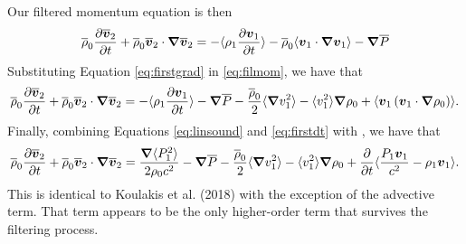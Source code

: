 Our filtered momentum equation is then
\begin{equation}
\label{eq:filmom}
\overline{\rho}_0\frac{\partial\overline{\boldsymbol{v}}_2}{\partial t} +\overline{\rho}_0\overline{\boldsymbol{v}}_2\cdot\boldsymbol{\nabla}\overline{\boldsymbol{v}}_2 = - \langle\rho_1\frac{\partial\boldsymbol{v}_1}{\partial t}\rangle 
                             -\overline{\rho}_0\langle\boldsymbol{v}_1\cdot\boldsymbol{\nabla}\boldsymbol{v}_1 \rangle
                             -\boldsymbol{\nabla}\overline{P}
\end{equation}
Substituting Equation \ref{eq:firstgrad} in \ref{eq:filmom}, we have that
\begin{equation}
\label{eq:filtwo}
\overline{\rho}_0\frac{\partial\overline{\boldsymbol{v}}_2}{\partial t} +\overline{\rho}_0\overline{\boldsymbol{v}}_2\cdot\boldsymbol{\nabla}\overline{\boldsymbol{v}}_2 = 
                             - \langle\rho_1\frac{\partial\boldsymbol{v}_1}{\partial t}\rangle 
                             -\boldsymbol{\nabla}\overline{P}
 -\frac{\overline{\rho}_0}{2}\langle\boldsymbol{\nabla} v_1^2\rangle -\langle v_1^2\rangle\boldsymbol{\nabla}\rho_0 
 +\langle\boldsymbol{v}_1\left(\boldsymbol{v}_1\cdot\boldsymbol{\nabla}\rho_0\right)\rangle .
\end{equation}
Finally, combining Equations \ref{eq:linsound} and \ref{eq:firstdt} with \label{eq:filtwo}, we have that
\begin{equation}
\label{eq:filthree}
\overline{\rho}_0\frac{\partial\overline{\boldsymbol{v}}_2}{\partial t} +\overline{\rho}_0\overline{\boldsymbol{v}}_2\cdot\boldsymbol{\nabla}\overline{\boldsymbol{v}}_2 = 
                             \frac{\boldsymbol{\nabla}\langle P_1^2 \rangle}{2\rho_0 c^2}
                             -\boldsymbol{\nabla}\overline{P}
 -\frac{\overline{\rho}_0}{2}\langle\boldsymbol{\nabla} v_1^2\rangle -\langle v_1^2\rangle\boldsymbol{\nabla}\rho_0 
 +\frac{\partial}{\partial t}\langle\frac{P_1\boldsymbol{v}_1}{c^2} - \rho_1\boldsymbol{v}_1 \rangle.
\end{equation}
This is identical to Koulakis et al. (2018) with the exception of the advective term.  That term appears to be the only higher-order term that survives the filtering process.

